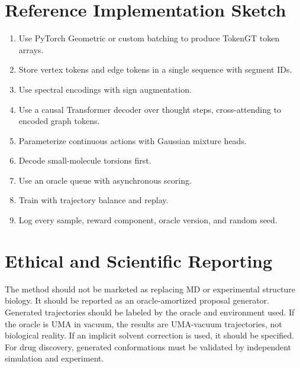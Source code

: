 \documentclass[11pt]{article}
\begin{document}
\section{Reference Implementation Sketch}

\begin{enumerate}[leftmargin=2em]
  \item Use PyTorch Geometric or custom batching to produce TokenGT token arrays.
  \item Store vertex tokens and edge tokens in a single sequence with segment IDs.
  \item Use spectral encodings with sign augmentation.
  \item Use a causal Transformer decoder over thought steps, cross-attending to encoded graph tokens.
  \item Parameterize continuous actions with Gaussian mixture heads.
  \item Decode small-molecule torsions first.
  \item Use an oracle queue with asynchronous scoring.
  \item Train with trajectory balance and replay.
  \item Log every sample, reward component, oracle version, and random seed.
\end{enumerate}

\section{Ethical and Scientific Reporting}

The method should not be marketed as replacing MD or experimental structure biology. It should be reported as an oracle-amortized proposal generator. Generated trajectories should be labeled by the oracle and environment used. If the oracle is UMA in vacuum, the results are UMA-vacuum trajectories, not biological reality. If an implicit solvent correction is used, it should be specified. For drug discovery, generated conformations must be validated by independent simulation and experiment.
\end{document}
